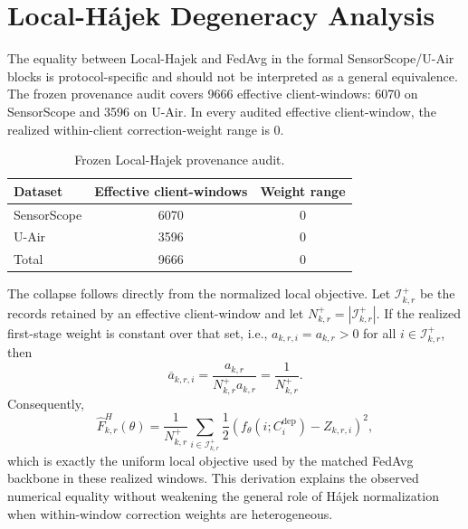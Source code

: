 \documentclass[letterpaper,journal]{IEEEtran}
\begin{document}
\section{Local-H\'ajek Degeneracy Analysis}
\label{app:local_hajek}

The equality between Local-Hajek and FedAvg in the formal SensorScope/U-Air
blocks is protocol-specific and should not be interpreted as a general
equivalence.  The frozen provenance audit covers
9666 effective client-windows: 6070 on SensorScope and
3596 on U-Air.  In every audited effective client-window, the realized
within-client correction-weight range is 0.

\begin{table}[t]
\centering
\caption{Frozen Local-Hajek provenance audit.}
\label{tab:app_local_hajek}
\footnotesize
\setlength{\tabcolsep}{5pt}
\begin{tabular}{lcc}
\toprule
Dataset & Effective client-windows & Weight range\\
\midrule
SensorScope & 6070 & $0$\\
U-Air & 3596 & $0$\\
\midrule
Total & 9666 & $0$\\
\bottomrule
\end{tabular}
\end{table}

The collapse follows directly from the normalized local objective.  Let
$\mathcal I_{k,r}^{+}$ be the records retained by an effective client-window
and let $N_{k,r}^{+}=|\mathcal I_{k,r}^{+}|$.  If the realized first-stage
weight is constant over that set, i.e.,
$a_{k,r,i}=a_{k,r}>0$ for all $i\in\mathcal I_{k,r}^{+}$, then
\begin{equation}
 \overline a_{k,r,i}
 =
 \frac{a_{k,r}}
 {N_{k,r}^{+}a_{k,r}}
 =
 \frac{1}{N_{k,r}^{+}}.
 \label{eq:app_local_hajek_uniform}
\end{equation}
Consequently,
\begin{equation}
 \widehat F^H_{k,r}(\theta)
 =
 \frac{1}{N_{k,r}^{+}}
 \sum_{i\in\mathcal I_{k,r}^{+}}
 \frac{1}{2}
 \left(
 f_\theta(i;C_i^{\mathrm{dep}})-Z_{k,r,i}
 \right)^2,
 \label{eq:app_local_hajek_collapse}
\end{equation}
which is exactly the uniform local objective used by the matched FedAvg
backbone in these realized windows.  This derivation explains the observed
numerical equality without weakening the general role of H\'ajek normalization
when within-window correction weights are heterogeneous.
\end{document}
